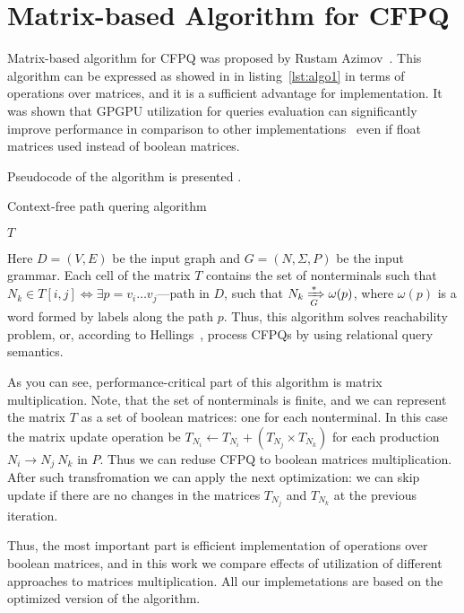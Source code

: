 \section{Matrix-based Algorithm for CFPQ}

Matrix-based algorithm for CFPQ was proposed by Rustam Azimov~\cite{Azimov:2018:CPQ:3210259.3210264}.
This algorithm can be expressed as showed in in listing~\ref{lst:algo1} in terms of operations over matrices, and it is a sufficient advantage for implementation.
It was shown that GPGPU utilization for queries evaluation can significantly improve performance in comparison to other implementations~\cite{Azimov:2018:CPQ:3210259.3210264} even if float matrices used instead of boolean matrices.

Pseudocode of the algorithm is presented .


\begin{algorithm}
\begin{algorithmic}[1]
\caption{Context-free path quering algorithm}
\label{lst:algo1}

    \EndFor

    \EndWhile
\State \Return $T$
\EndFunction
\end{algorithmic}
\end{algorithm}

Here $D = (V, E)$ be the input graph and $G = (N,\Sigma,P)$ be the input grammar.
Each cell of the matrix $T$ contains the set of nonterminals such that $N_k \in T[i,j] \iff \exists p = v_i \ldots v_j $---path in $D$, such that $N_k \xRightarrow[G]{*} \omega(p) $, where $\omega(p)$ is a word formed by labels along the path $p$.
Thus, this algorithm solves reachability problem, or, according to Hellings~\cite{hellingsRelational}, process CFPQs by using relational query semantics.

As you can see, performance-critical part of this algorithm is matrix multiplication.
Note, that the set of nonterminals is finite, and we can represent the matrix $T$ as a set of boolean matrices: one for each nonterminal.
In this case the matrix update operation be $T_{N_i} \leftarrow T_{N_i} + (T_{N_j} \times T_{N_k})$ for each production $N_i \rightarrow N_j \ N_k$ in $P$.
Thus we can reduse CFPQ to boolean matrices multiplication.
After such transfromation we can apply the next optimization: we can skip update if there are no changes in the matrices $T_{N_j}$ and $T_{N_k}$ at the previous iteration.

Thus, the most important part is efficient implementation of operations over boolean matrices, and in this work we compare effects of utilization of different approaches to matrices multiplication.
All our implemetations are based on the optimized version of the algorithm.

